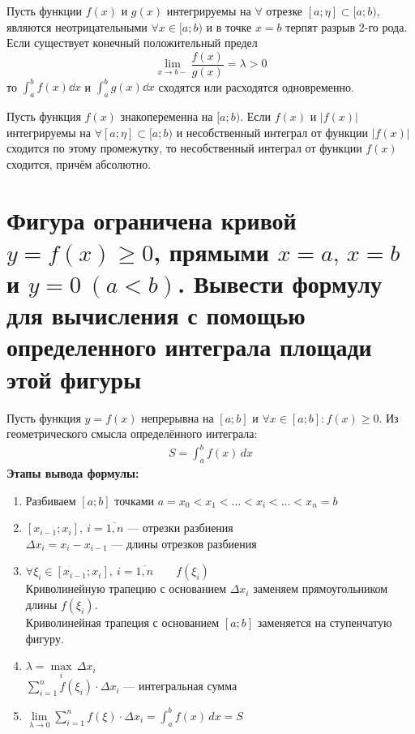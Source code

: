 \begin{theorem}
    Пусть функции $f(x)$ и $g(x)$ интегрируемы на $\forall$ отрезке $[a; \eta] \subset [a; b)$, являются неотрицательными $\forall x \in [a;b)$ и в точке $x = b$ терпят разрыв 2-го рода. Если существует конечный положительный предел
    \[
        \lim\limits_{x \to b-} \frac{f(x)}{g(x)} = \lambda > 0
    \]
    то $\int_{a}^{b} f(x)\dd{x}$ и $\int_{a}^{b} g(x)\dd{x}$ сходятся или расходятся одновременно.
\end{theorem}

\begin{theorem}
    Пусть функция $f(x)$ знакопеременна на $[a;b)$. Если $f(x)$ и $|f(x)|$ интегрируемы на $\forall [a; \eta] \subset [a;b)$ и несобственный интеграл от функции $|f(x)|$ сходится по этому промежутку, то несобственный интеграл от функции $f(x)$ сходится, причём абсолютно.
\end{theorem}

\section{Фигура ограничена кривой $y=f(x) \geqslant 0$, прямыми $x=a,\, x=b$ и ${y=0\ (a<b)}$. Вывести формулу для вычисления с помощью определенного интеграла площади этой фигуры} 
\setcounter{equation}{0}
Пусть функция $y = f(x)$ непрерывна на $[a;b]$ и $\forall x  \in [a;b]\colon f(x) \geqslant 0$. Из геометрического смысла определённого интеграла:
\begin{gather}
     \boxed{S = \int_{a}^{b} f(x)\, dx}
\end{gather}
\textbf{Этапы вывода формулы:}
\begin{enumerate}
    \item Разбиваем $[a;b]$ точками $a = x_0 < x_1 < \ldots < x_i < \ldots < x_n = b$
    \item $[x_{i-1}; x_i],\ i = \overline{1, n}$ --- отрезки разбиения \\
    $\Delta x_i = x_i - x_{i-1}$ --- длины отрезков разбиения
    \item $\forall \xi_i \in [x_{i-1}; x_i],\ i = \overline{1, n}\qquad f(\xi_i)$ \\
    Криволинейную трапецию с основанием $\Delta x_i$ заменяем прямоугольником длины $f(\xi_i)$. \\ 
    Криволинейная трапеция с основанием $[a;b]$ заменяется на ступенчатую фигуру.
    \item $\lambda = \underset{i}{\max}\, \Delta x_i$ \\
    $\displaystyle\sum_{i=1}^{n} f(\xi_i)\cdot \Delta x_i$ --- интегральная сумма
    \item $\displaystyle\lim\limits_{\lambda \to 0} \sum_{i=1}^{n} f(\xi)\cdot \Delta x_i = \boxed{\int_{a}^{b} f(x)\, dx = S}$
\end{enumerate}

